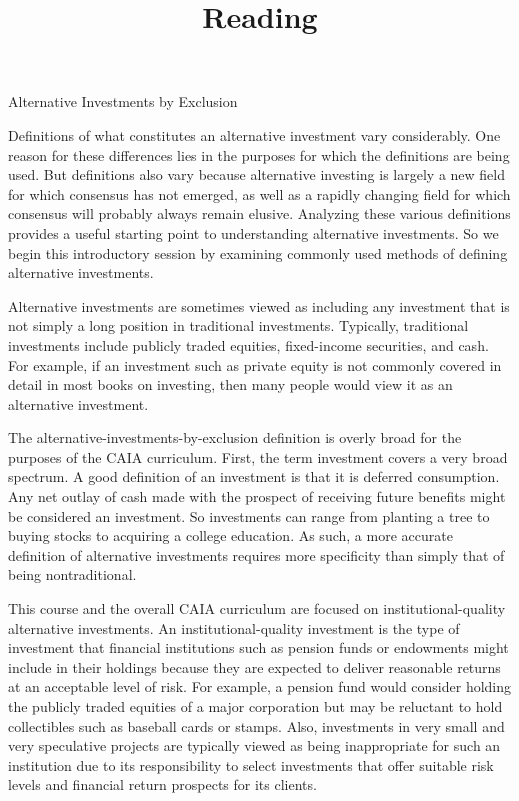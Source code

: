 \documentclass[11pt]{article}
\title{Reading }
\author{}
\date{}
\begin{document}
\maketitle
Alternative Investments by Exclusion

Definitions of what constitutes an alternative investment vary considerably. One reason for these differences lies in the purposes for which the definitions are being used. But definitions also vary because alternative investing is largely a new field for which consensus has not emerged, as well as a rapidly changing field for which consensus will probably always remain elusive. Analyzing these various definitions provides a useful starting point to understanding alternative investments. So we begin this introductory session by examining commonly used methods of defining alternative investments.

Alternative investments are sometimes viewed as including any investment that is not simply a long position in traditional investments. Typically, traditional investments include publicly traded equities, fixed-income securities, and cash. For example, if an investment such as private equity is not commonly covered in detail in most books on investing, then many people would view it as an alternative investment.

The alternative-investments-by-exclusion definition is overly broad for the purposes of the CAIA curriculum. First, the term investment covers a very broad spectrum. A good definition of an investment is that it is deferred consumption. Any net outlay of cash made with the prospect of receiving future benefits might be considered an investment. So investments can range from planting a tree to buying stocks to acquiring a college education. As such, a more accurate definition of alternative investments requires more specificity than simply that of being nontraditional.

This course and the overall CAIA curriculum are focused on institutional-quality alternative investments. An institutional-quality investment is the type of investment that financial institutions such as pension funds or endowments might include in their holdings because they are expected to deliver reasonable returns at an acceptable level of risk. For example, a pension fund would consider holding the publicly traded equities of a major corporation but may be reluctant to hold collectibles such as baseball cards or stamps. Also, investments in very small and very speculative projects are typically viewed as being inappropriate for such an institution due to its responsibility to select investments that offer suitable risk levels and financial return prospects for its clients.
\end{document}
